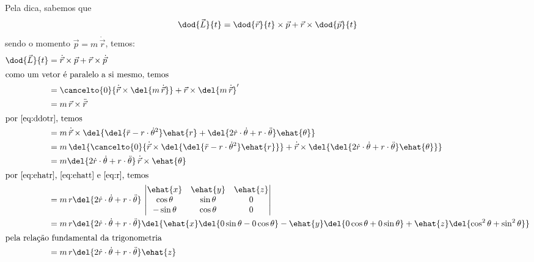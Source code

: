 \documentclass[]{IMTexam}
\begin{document}
\begin{questions}
\begin{parts}
		\begin{solution}
			Pela dica, sabemos que
			\[ \dod{\vec{L}}{t}=\dod{\vec{r}}{t}\times \vec{p}+\vec{r}\times\dod{\vec{p}}{t} \]
			sendo o momento $ \vec{p}=m\,\dot{\vec{r}} $, temos:
			\begin{align*}
				\dod{\vec{L}}{t} & =\dot{\vec{r}}\times \vec{p}+\vec{r}\times\dot{\vec{p}}                                                                                                                                  \\
				\intertext{como um vetor é paralelo a si mesmo, temos}
				                 & =\cancelto{0}{\dot{\vec{r}}\times \del{m\,\dot{\vec{r}}}}+\vec{r}\times\del{m\,\dot{\vec{r}}}'                                                                                           \\
				                 & =m\,\vec{r}\times\ddot{\vec{r}}                                                                                                                                                          \\
				\intertext{por \ref{eq:ddotr}, temos}
				                 & =m\,\dot{\vec{r}}\times\del{\del{\ddot{r}-r\cdot\dot{\theta}^{2}}\ehat{r}+\del{2\dot{r}\cdot\dot{\theta}+r\cdot\ddot{\theta}}\ehat{\theta}}                                              \\
				                 & =m\,\del{\cancelto{0}{\dot{\vec{r}}\times\del{\del{\ddot{r}-r\cdot\dot{\theta}^{2}}\ehat{r}}}+\dot{\vec{r}}\times\del{\del{2\dot{r}\cdot\dot{\theta}+r\cdot\ddot{\theta}}\ehat{\theta}}} \\
				                 & =m\del{2\dot{r}\cdot\dot{\theta}+r\cdot\ddot{\theta}}\,\dot{\vec{r}}\times\ehat{\theta}                                                                                                  \\
				\intertext{por \ref{eq:ehatr}, \ref{eq:ehatt} e \ref{eq:r}, temos}
				                 & =m\,r\del{2\dot{r}\cdot\dot{\theta}+r\cdot\ddot{\theta}}\,\begin{vmatrix}
					\ehat{x}    & \ehat{y}   & \ehat{z} \\
					\cos\theta  & \sin\theta & 0        \\
					-\sin\theta & \cos\theta & 0
				\end{vmatrix}                                                                                                     \\
				                 & =m\,r\del{2\dot{r}\cdot\dot{\theta}+r\cdot\ddot{\theta}}\del{\ehat{x}\del{0\sin\theta-0\cos\theta}-\ehat{y}\del{0\cos\theta+0\sin\theta}+\ehat{z}\del{\cos^{2}\theta+\sin^{2}\theta}}    \\
				\intertext{pela relação fundamental da trigonometria}
				                 & =m\,r\del{2\dot{r}\cdot\dot{\theta}+r\cdot\ddot{\theta}}\ehat{z}
			\end{align*}
		\end{solution}


\end{parts}
\end{questions}
\end{document}
